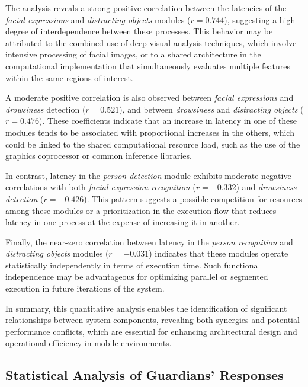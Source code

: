                 The analysis reveals a strong positive correlation between the latencies of the \textit{facial expressions} and \textit{distracting objects} modules (\(r = 0.744\)), suggesting a high degree of interdependence between these processes. This behavior may be attributed to the combined use of deep visual analysis techniques, which involve intensive processing of facial images, or to a shared architecture in the computational implementation that simultaneously evaluates multiple features within the same regions of interest.
                
                A moderate positive correlation is also observed between \textit{facial expressions} and \textit{drowsiness} detection (\(r = 0.521\)), and between \textit{drowsiness} and \textit{distracting objects} (\(r = 0.476\)). These coefficients indicate that an increase in latency in one of these modules tends to be associated with proportional increases in the others, which could be linked to the shared computational resource load, such as the use of the graphics coprocessor or common inference libraries.
                
                In contrast, latency in the \textit{person detection} module exhibits moderate negative correlations with both \textit{facial expression recognition} (\(r = {-}0.332\)) and \textit{drowsiness detection} (\(r = {-}0.426\)). This pattern suggests a possible competition for resources among these modules or a prioritization in the execution flow that reduces latency in one process at the expense of increasing it in another.
                
                Finally, the near-zero correlation between latency in the \textit{person recognition} and \textit{distracting objects} modules (\(r = -0.031\)) indicates that these modules operate statistically independently in terms of execution time. Such functional independence may be advantageous for optimizing parallel or segmented execution in future iterations of the system.
                
                In summary, this quantitative analysis enables the identification of significant relationships between system components, revealing both synergies and potential performance conflicts, which are essential for enhancing architectural design and operational efficiency in mobile environments.
                
                
                \subsection{Statistical Analysis of Guardians' Responses}
                \label{sec:stats-analysis}

